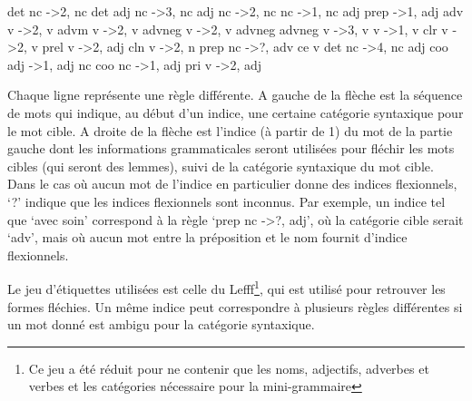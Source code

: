 \begin{framed}
det nc -\textgreater 2, nc\newline
det adj nc -\textgreater 3, nc\newline
adj nc -\textgreater 2, nc\newline
nc -\textgreater 1, nc\newline
adj prep -\textgreater 1, adj\newline
adv v -\textgreater 2, v\newline
advm v -\textgreater 2, v\newline
advneg v -\textgreater 2, v\newline
advneg advneg v -\textgreater 3, v\newline
v -\textgreater 1, v\newline
clr v -\textgreater 2, v\newline
prel v -\textgreater 2, adj \newline
cln v -\textgreater 2, n\newline
prep nc -\textgreater ?, adv\newline
ce v det nc -\textgreater 4, nc\newline
adj coo adj -\textgreater 1, adj\newline
nc coo nc -\textgreater 1, adj\newline
pri v -\textgreater 2, adj
\end{framed}

Chaque ligne représente une règle différente. A gauche de la flèche est la séquence de mots qui indique, au début d'un indice, une certaine catégorie syntaxique pour le mot cible. A droite de la flèche est l'indice (à partir de 1) du mot de la partie gauche dont les informations grammaticales seront utilisées pour fléchir les mots cibles (qui seront des lemmes), suivi de la catégorie syntaxique du mot cible. Dans le cas où aucun mot de l'indice en particulier donne des indices flexionnels, \lq{?}\rq{} indique que les indices flexionnels sont inconnus. Par exemple, un indice tel que \lq{avec soin}\rq{} correspond à la règle \lq{prep nc -\textgreater ?, adj}\rq{}, où la catégorie cible serait \lq{adv}\rq{}, mais où aucun mot entre la préposition et le nom fournit d'indice flexionnels.

Le jeu d'étiquettes utilisées est celle du Lefff\footnote{Ce jeu a été réduit pour ne contenir que les noms, adjectifs, adverbes et verbes et les catégories nécessaire pour la mini-grammaire}, qui est utilisé pour retrouver les formes fléchies. Un même indice peut correspondre à plusieurs règles différentes si un mot donné est ambigu pour la catégorie syntaxique.

